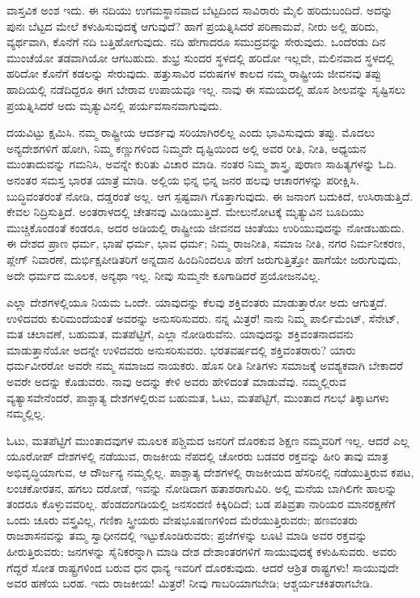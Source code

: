 ವಾಸ್ತವಿಕ ಅಂಶ ಇದು. ಈ ನದಿಯು ಉಗಮಸ್ಥಾನವಾದ ಬೆಟ್ಟದಿಂದ ಸಾವಿರಾರು ಮೈಲಿ ಹರಿದುಬಂದಿದೆ. ಅದನ್ನು ಪುನಃ ಬೆಟ್ಟದ ಮೇಲೆ ಕಳುಹಿಸುವುದಕ್ಕೆ ಆಗುವುದೆ? ಹಾಗೆ ಪ್ರಯತ್ನಿಸಿದರೆ ಪರಿಣಾಮವೆ, ನೀರು ಅಲ್ಲಿ ಹರಿದು, ವ್ಯರ್ಥವಾಗಿ, ಕೊನೆಗೆ ನದಿ ಬತ್ತಿಹೋಗುವುದು. ನದಿ ಹೇಗಾದರೂ ಸಮುದ್ರವನ್ನು ಸೇರುವುದು. ಒಂದೆರಡು ದಿನ ಮುಂಚೆಯೋ ತಡವಾಗಿಯೋ ಆಗಬಹುದು. ಶುಭ್ರ ಸುಂದರ ಸ್ಥಳದಲ್ಲಿ ಹರಿದೋ ಇಲ್ಲವೇ, ಮಲಿನವಾದ ಸ್ಥಳದಲ್ಲಿ ಹರಿದೋ ಕೊನೆಗೆ ಕಡಲನ್ನು ಸೇರುವುದು. ಹತ್ತುಸಾವಿರ ವರುಷಗಳ ಕಾಲದ ನಮ್ಮ ರಾಷ್ಟ್ರೀಯ ಜೀವನವು ತಪ್ಪು ಹಾದಿಯಲ್ಲಿ ನಡೆದಿದ್ದರೂ ಈಗ ಬೇರಾವ ಉಪಾಯವೂ ಇಲ್ಲ. ನಾವು ಈ ಸಮಯದಲ್ಲಿ ಹೊಸ ಶೀಲವನ್ನು ಸೃಷ್ಟಿಸಲು ಪ್ರಯತ್ನಿಸಿದರೆ ಅದು ಮೃತ್ಯುವಿನಲ್ಲಿ ಪರ್ಯವಸಾನವಾಗುವುದು.

ದಯವಿಟ್ಟು ಕ್ಷಮಿಸಿ. ನಮ್ಮ ರಾಷ್ಟ್ರೀಯ ಆದರ್ಶವು ಸರಿಯಾಗಿರಲಿಲ್ಲ ಎಂದು ಭಾವಿಸುವುದು ತಪ್ಪು. ಮೊದಲು ಅನ್ಯದೇಶಗಳಿಗೆ ಹೋಗಿ, ನಿಮ್ಮ ಕಣ್ಣುಗಳಿಂದ ನಿಮ್ಮದೇ ದೃಷ್ಟಿಯಿಂದ ಅಲ್ಲಿ ಅವರ ರೀತಿ, ನೀತಿ, ಅಧ್ಯಯನ ಮುಂತಾದುವನ್ನು ಗಮನಿಸಿ, ಅವನ್ನೇ ಕುರಿತು ವಿಚಾರ ಮಾಡಿ. ನಂತರ ನಿಮ್ಮ ಶಾಸ್ತ್ರ, ಪುರಾಣ ಸಾಹಿತ್ಯಗಳನ್ನು ಓದಿ. ಅನಂತರ ಸಮಸ್ತ ಭಾರತ ಯಾತ್ರೆ ಮಾಡಿ. ಅಲ್ಲಿಯ ಭಿನ್ನ ಭಿನ್ನ ಜನರ ಹಲವು ಆಚಾರಗಳನ್ನು ಪರೀಕ್ಷಿಸಿ. ಬುದ್ಧಿವಂತರಂತೆ ನೋಡಿ, ದಡ್ಡರಂತೆ ಅಲ್ಲ. ಆಗ ಸ್ಪಷ್ಟವಾಗಿ ಗೊತ್ತಾಗುವುದು. ಈ ಜನಾಂಗ ಬದುಕಿದೆ, ಉಸಿರಾಡುತ್ತಿದೆ. ಕೇವಲ ನಿದ್ರಿಸುತ್ತಿದೆ. ಅಂತರಾಳದಲ್ಲಿ ಚೇತನವು ಮಿಡಿಯುತ್ತಿದೆ. ಮೇಲುನೋಟಕ್ಕೆ ಮೃತ್ಯುವಿನ ಬೂದಿಯು ಮುಚ್ಚಿಕೊಂಡಂತೆ ಕಂಡರೂ, ಅದರ ಅಡಿಯಲ್ಲಿ ರಾಷ್ಟ್ರೀಯ ಜೀವನದ ಚಿಂತೆಯು ಉರಿಯುವುದನ್ನು ನೋಡಬಹುದು. ಈ ದೇಶದ ಪ್ರಾಣ ಧರ್ಮ, ಭಾಷೆ ಧರ್ಮ, ಭಾವ ಧರ್ಮ; ನಿಮ್ಮ ರಾಜನೀತಿ, ಸಮಾಜ ನೀತಿ, ನಗರ ನಿರ್ಮನೀಕರಣ, ಪ್ಲೇಗ್​ ನಿವಾರಣೆ, ದುರ್ಭಿಕ್ಷಪೀಡಿತರಿಗೆ ಅನ್ನದಾನ ಹಿಂದಿನಿಂದಲೂ ಹೇಗೆ ಜರುಗುತ್ತಿತ್ತೋ ಹಾಗೆಯೇ ಜರುಗುವುದು, ಅದೇ ಧರ್ಮದ ಮೂಲಕ, ಅನ್ಯಥಾ ಇಲ್ಲ. ನೀವು ಸುಮ್ಮನೇ ಕೂಗಾಡಿದರೆ ಪ್ರಯೋಜನವಿಲ್ಲ.

ಎಲ್ಲಾ ದೇಶಗಳಲ್ಲಿಯೂ ನಿಯಮ ಒಂದೇ. ಯಾವುದನ್ನು ಕೆಲವು ಶಕ್ತಿವಂತರು ಮಾಡುತ್ತಾರೋ ಅದು ಆಗುತ್ತದೆ. ಉಳಿದವರು ಕುರಿಮಂದೆಯಂತೆ ಅವರನ್ನು ಅನುಸರಿಸುವರು. ನನ್ನ ಮಿತ್ರರೆ! ನಾನು ನಿಮ್ಮ ಪಾರ್ಲಿಮೆಂಟ್​, ಸೆನೇಟ್​, ಮತ ಚಲಾವಣೆ, ಬಹುಮತ, ಮತಪೆಟ್ಟಿಗೆ, ಎಲ್ಲಾ ನೋಡಿರುವೆನು. ಯಾವುದನ್ನು ಶಕ್ತಿವಂತನಾದವನು ಮಾಡುತ್ತಾನೆಯೋ ಅದನ್ನೇ ಉಳಿದವರು ಅನುಸರಿಸುವರು. ಭರತವರ್ಷದಲ್ಲಿ ಶಕ್ತಿ\break ವಂತರಾರು? ಯಾರು ಧರ್ಮವೀರರೋ ಅವರೇ ನಮ್ಮ ಸಮಾಜದ ನಾಯಕರು. ಹೊಸ ರೀತಿ ನೀತಿಗಳು ಸಮಾಜಕ್ಕೆ ಅವಶ್ಯಕವಾಗಿ ಬೇಕಾದರೆ ಅವರೇ ಅದನ್ನು ಕೊಡುವರು. ನಾವು ಅದನ್ನು ಕೇಳಿ ಅವರು ಹೇಳಿದಂತೆ ಮಾಡುವೆವು. ನಮ್ಮಲ್ಲಿರುವ ವ್ಯತ್ಯಾಸವೇನೆಂದರೆ, ಪಾಶ್ಚಾತ್ಯ ದೇಶಗಳಲ್ಲಿರುವ ಬಹುಮತ, ಓಟು, ಮತಪೆಟ್ಟಿಗೆ, ಮುಂತಾದ ಗಲಭೆ ತಿಕ್ಕಾಟಗಳು ನಮ್ಮಲ್ಲಿಲ್ಲ.

ಓಟು, ಮತಪೆಟ್ಟಿಗೆ ಮುಂತಾದವುಗಳ ಮೂಲಕ ಪಶ್ಚಿಮದ ಜನರಿಗೆ ದೊರಕುವ ಶಿಕ್ಷಣ ನಮ್ಮವರಿಗೆ ಇಲ್ಲ. ಆದರೆ ಎಲ್ಲ ಯೂರೋಪ್​ ದೇಶಗಳಲ್ಲಿ ನಡೆಯುವ, ರಾಜಕೀಯ ನೆಪದಲ್ಲಿ ಚೋರರು ಬಡವರ ರಕ್ತವನ್ನು ಹೀರಿ ತಾವು ಮಾತ್ರ ಅಭಿವೃದ್ಧಿಯಾಗುವ, ಆ ದೌರ್ಜನ್ಯ ನಮ್ಮಲ್ಲಿಲ್ಲ. ಪಾಶ್ಚಾತ್ಯ ದೇಶಗಳಲ್ಲಿ ರಾಜಕೀಯದ ಹೆಸರಿನಲ್ಲಿ ನಡೆಯುತ್ತಿರುವ ಕಪಟ, ಲಂಚಕೋರತನ, ಹಗಲು ದರೋಡೆ, ಇವನ್ನು ನೋಡಿದಾಗ ಹತಾಶರಾಗುವಿರಿ. ಅಲ್ಲಿ ಮನೆಯ ಬಾಗಿಲಿಗೇ ಹಾಲನ್ನು ತಂದರೂ ಕೊಳ್ಳುವವರಿಲ್ಲ. ಹೆಂಡದಂಗಡಿಯಲ್ಲಿ ಜನಸಂದಣಿ ಕಿಕ್ಕಿರಿದಿದೆ; ಬಡ ಪತಿವ್ರತಾ ನಾರಿಯರ ಮಾನರಕ್ಷಣೆಗೆ ಒಂದು ಚೂರು ವಸ್ತ್ರವಿಲ್ಲ, ಗಣಿಕಾ ಸ್ತ್ರೀಯರು ವೇಷಭೂಷಣಗಳಿಂದ ಮೆರೆಯುತ್ತಿರುವರು; ಹಣವಂತರು ರಾಜಶಾಸನವನ್ನು ತಮ್ಮ ಸ್ವಾಧೀನದಲ್ಲಿ ಇಟ್ಟುಕೊಂಡಿರುವರು; ಪ್ರಜೆಗಳನ್ನು ಲೂಟಿ ಮಾಡಿ ಅವರ ರಕ್ತವನ್ನು ಹೀರುತ್ತಿರುವರು; ಜನಗಳನ್ನು ಸೈನಿಕರನ್ನಾಗಿ ಮಾಡಿ ದೇಶ ದೇಶಾಂತರ\-ಗಳಿಗೆ ಸಾಯುವುದಕ್ಕೆ ಕಳುಹಿಸುವರು. ಅವರು ಗೆದ್ದರೆ ಸೋತ ರಾಷ್ಟ್ರಗಳಿಂದ ಬರುವ ಧನ ಧಾನ್ಯ ಇವರಿಗೆ ದೊರಕುವುದು. ಆದರೆ ಆಶ್ರಿತ ರಾಷ್ಟ್ರಗಳು! ಸಾಯುವುದೇ ಅವರ ಹಣೆಯ ಬರಹ. ಇದು ರಾಜಕೀಯ! ಮಿತ್ರರೆ! ನೀವು ಗಾಬರಿಯಾಗಬೇಡಿ; ಆಶ್ಚರ್ಯಚಕಿತರಾಗಬೇಡಿ.

